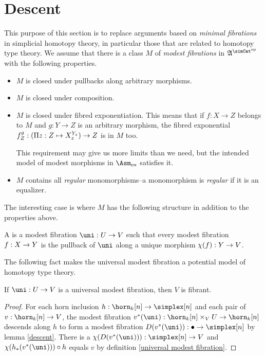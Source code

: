 \documentclass[csh.tex]{subfiles}
\begin{document}
\section{Descent}
This purpose of this section is to replace arguments based on \emph{minimal fibrations} in simplicial homotopy theory, in particular those that are related to homotopy type theory. We assume that there is a class $M$ of \emph{modest fibrations} in $\ambient\s$ with the following properties.
\begin{itemize}
\item $M$ is closed under pullbacks along arbitrary morphisms.
\item $M$ is closed under composition.
\item $M$ is closed under fibred exponentiation. This means that if $f:X\to Z$ belongs to $M$ and $g:Y\to Z$ is an arbitrary morphism, the fibred exponential $f^g_Z:(\Pi z: Z \mapsto X_z^{Y_z})\to Z$ is in $M$ too.

This requirement may give us more limits than we need, but the intended model of modest morphisms in $\Asm\ex$ satisfies it.

\item $M$ contains all \emph{regular} monomorphisms--a monomorphism is \emph{regular} if it is an equalizer.
\end{itemize} 

The interesting case is where $M$ has the following structure in addition to the properties above.

\begin{definition} A  is a modest fibration $\uni\of U\to V$ such that every modest fibration $f: X\to Y$ is the pullback of $\uni$ along a unique morphism $\chi(f): Y\to V$.
\end{definition}

The following fact makes the universal modest fibration a potential model of homotopy type theory.

\begin{theorem} If $\uni\of U\to V$ is a universal modest fibration, then $V$ is fibrant. \label{fibrant universe} \end{theorem}

\begin{proof} For each horn inclusion $h\of \horn_k[n]\to\simplex[n]$ and each pair of $v\of \horn_k[n]\to V$, the modest fibration $v\ri(\uni)\of \horn_k[n]\times_V U \to \horn_k[n]$ descends along $h$ to form a modest fibration $D(v\ri(\uni))\of \bullet\to\simplex[n]$ by lemma \ref{descent}. There is a $\chi(D(v\ri(\uni)))\of\simplex[n]\to V$ and $\chi(h_*(v\ri(\uni)))\circ h$ equals $v$ by definition \ref{universal modest fibration}.
\end{proof}
\end{document}

